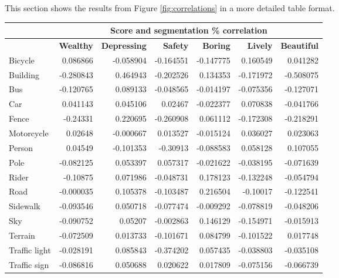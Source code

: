 This section shows the results from Figure \ref{fig:correlations} in a more detailed table format.

\begin{table}[H]
    \begin{tabular}{|l|rrrrrr|}
    \hline
    & \multicolumn{6}{c|}{\textbf{Score and segmentation \% correlation}}              \\ \hline
    & \textbf{Wealthy}   & \textbf{Depressing} & \textbf{Safety}    & \textbf{Boring}    & \textbf{Lively}    & \textbf{Beautiful} \\ \hline
    Bicycle       & 0.086866  & -0.058904  & -0.164551 & -0.147775 & 0.160549  & 0.041282  \\
    Building      & -0.280843 & 0.464943   & -0.202526 & 0.134353  & -0.171972 & -0.508075 \\
    Bus           & -0.120765 & 0.089133   & -0.048565 & -0.014197 & -0.075356 & -0.127071 \\
    Car           & 0.041143  & 0.045106   & 0.02467   & -0.022377 & 0.070838  & -0.041766 \\
    Fence         & -0.24331  & 0.220695   & -0.260908 & 0.061112  & -0.172308 & -0.218291 \\
    Motorcycle    & 0.02648   & -0.000667  & 0.013527  & -0.015124 & 0.036027  & 0.023063  \\
    Person        & 0.04549   & -0.101353  & -0.30913  & -0.088583 & 0.058128  & 0.107055  \\
    Pole          & -0.082125 & 0.053397   & 0.057317  & -0.021622 & -0.038195 & -0.071639 \\
    Rider         & -0.10875  & 0.071986   & -0.048731 & 0.178123  & -0.132248 & -0.054794 \\
    Road          & -0.000035 & 0.105378   & -0.103487 & 0.216504  & -0.10017  & -0.122541 \\
    Sidewalk      & -0.093546 & 0.050718   & -0.077474 & -0.009292 & -0.078819 & -0.048206 \\
    Sky           & -0.090752 & 0.05207    & -0.002863 & 0.146129  & -0.154971 & -0.015913 \\
    Terrain       & -0.072509 & 0.013733   & -0.101671 & 0.084799  & -0.101522 & 0.017748  \\
    Traffic light & -0.028191 & 0.085843   & -0.374202 & 0.057435  & -0.038803 & -0.035108 \\
    Traffic sign  & -0.086816 & 0.050688   & 0.020622  & 0.017809  & -0.075156 & -0.066739 \\

\end{tabular}
\end{table}

